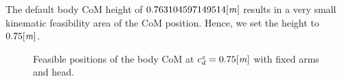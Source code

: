 The default body CoM height of $0.763104597149514 \mathit{[m]}$ results in a very
small kinematic feasibility area of the CoM position. Hence, we set the height
to $0.75 \mathit{[m]}$.

\begin{figure}[!ht]
    \caption{Feasible positions of the body CoM at $c_{d}^{z} = 0.75 \mathit{[m]}$
    with fixed arms and head.}
    \label{fig-kinematic-feasibility}
\end{figure}



\clearpage



\clearpage



\clearpage



\clearpage



\clearpage



